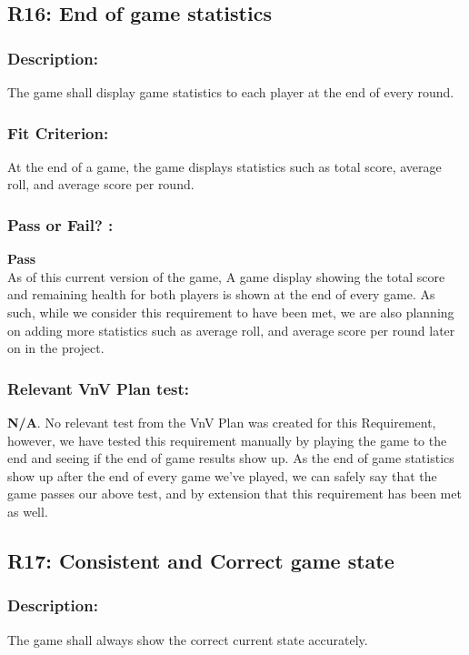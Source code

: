 \documentclass[12pt, titlepage]{article}
\begin{document}
\subsection{R16: End of game statistics} 
\label{R16} 

\subsubsection*{Description:}The game shall display game statistics to each player at the end of every round.

\subsubsection*{Fit Criterion:}At the end of a game, the game displays statistics such as total score, average roll, and average score per round.

\subsubsection*{Pass or Fail? :} 

 \noindent \textbf{Pass}\\
 
 \noindent As of this current version of the game, A game display showing the total score and remaining health for both players is shown at the end of every game. As such, while we consider this requirement to have been met, we are also planning on adding more statistics such as average roll, and average score per round later on in the project.
 
 \subsubsection*{Relevant VnV Plan test: } \textbf{N/A}. No relevant test from the VnV Plan was created for this Requirement, however, we have tested this requirement manually by playing the game to the end and seeing if the end of game results show up. As the end of game statistics show up after the end of every game we've played, we can safely say that the game passes our above test, and by extension that this requirement has been met as well.


\subsection{R17: Consistent and Correct game state} 
\label{R17} 

\subsubsection*{Description:} The game shall always show the correct current state accurately.
\end{document}
